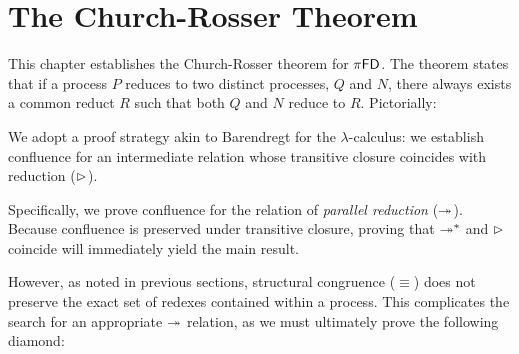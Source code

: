 \chapter{The Church-Rosser Theorem}\label{ch:church-rosser}
\newcommand{\zb}[2][1em]{\makebox[#1]{$\displaystyle#2$}}

This chapter establishes the Church-Rosser theorem for $\pi\textsf{FD}$. The theorem
states that if a process $P$ reduces to two distinct processes, $Q$ and $N$,
there always exists a common reduct $R$ such that both $Q$ and $N$ reduce to $R$.
Pictorially:

\begin{center}
\end{center}

We adopt a proof strategy akin to Barendregt \cite{Barendregt1984:LambdaCalcAndTypes}
for the $\lambda$-calculus: we establish confluence for an intermediate relation
whose transitive closure coincides with reduction ($\rhd$).

Specifically, we prove confluence for the relation of \emph{parallel reduction}
($\twoheadrightarrow$). Because confluence is preserved under transitive closure,
proving that $\twoheadrightarrow^*$ and $\rhd$ coincide will immediately yield the
main result.

However, as noted in previous sections, structural congruence ($\equiv$) does
not preserve the exact set of redexes contained within a process. This complicates
the search for an appropriate $\twoheadrightarrow$ relation, as we must ultimately prove
the following diamond:

\begin{center}
\end{center}

